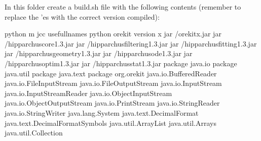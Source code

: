 \documentclass[letterpaper,10pt,english]{sphinxmanual}
\begin{document}
In this folder create a build.sh file with the following contents (remember to replace the ’es with the correct version compiled):

%
\begin{sphinxVerbatim}[commandchars=\\\{\}]

python \PYGZhy{}m jcc 
\PYGZhy{}\PYGZhy{}use\PYGZus{}full\PYGZus{}names 
\PYGZhy{}\PYGZhy{}python orekit 
\PYGZhy{}\PYGZhy{}version x 
\PYGZhy{}\PYGZhy{}jar /orekit\PYGZhy{}x.jar 
\PYGZhy{}\PYGZhy{}jar /hipparchus\PYGZhy{}core\PYGZhy{}1.3.jar 
\PYGZhy{}\PYGZhy{}jar /hipparchus\PYGZhy{}filtering\PYGZhy{}1.3.jar 
\PYGZhy{}\PYGZhy{}jar /hipparchus\PYGZhy{}fitting\PYGZhy{}1.3.jar 
\PYGZhy{}\PYGZhy{}jar /hipparchus\PYGZhy{}geometry\PYGZhy{}1.3.jar 
\PYGZhy{}\PYGZhy{}jar /hipparchus\PYGZhy{}ode\PYGZhy{}1.3.jar 
\PYGZhy{}\PYGZhy{}jar /hipparchus\PYGZhy{}optim\PYGZhy{}1.3.jar 
\PYGZhy{}\PYGZhy{}jar /hipparchus\PYGZhy{}stat\PYGZhy{}1.3.jar 
\PYGZhy{}\PYGZhy{}package java.io 
\PYGZhy{}\PYGZhy{}package java.util 
\PYGZhy{}\PYGZhy{}package java.text 
\PYGZhy{}\PYGZhy{}package org.orekit 
java.io.BufferedReader 
java.io.FileInputStream 
java.io.FileOutputStream 
java.io.InputStream 
java.io.InputStreamReader 
java.io.ObjectInputStream 
java.io.ObjectOutputStream 
java.io.PrintStream 
java.io.StringReader 
java.io.StringWriter 
java.lang.System 
java.text.DecimalFormat 
java.text.DecimalFormatSymbols 
java.util.ArrayList 
java.util.Arrays 
java.util.Collection 

\end{sphinxVerbatim}
\end{document}
